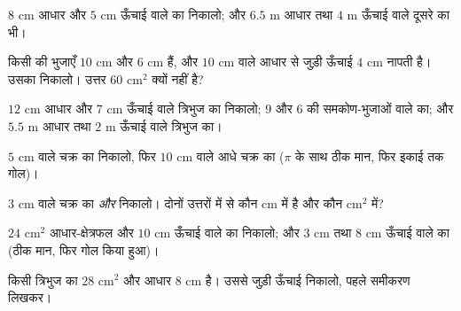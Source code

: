 \begin{exercise}[$\star$]\label{exo:g7:areas:1}
$8$ cm आधार और $5$ cm ऊँचाई वाले  का 
निकालो; और $6.5$ m आधार तथा $4$ m ऊँचाई वाले दूसरे का भी।
\end{exercise}

\begin{exercise}[$\star$]\label{exo:g7:areas:2}
किसी  की भुजाएँ $10$ cm और $6$ cm हैं, और $10$ cm
वाले आधार से जुड़ी ऊँचाई $4$ cm नापती है। उसका  निकालो।
उत्तर $60$ cm$^2$ क्यों नहीं है?
\end{exercise}

\begin{exercise}[$\star$]\label{exo:g7:areas:3}
$12$ cm आधार और $7$ cm ऊँचाई वाले त्रिभुज का  निकालो; $9$
और $6$ की समकोण-भुजाओं वाले  का; और $5.5$ m आधार तथा
$2$ m ऊँचाई वाले त्रिभुज का।
\end{exercise}

\begin{exercise}[$\star$]\label{exo:g7:areas:4}
$5$ cm  वाले चक्र का  निकालो, फिर $10$ cm 
वाले आधे चक्र का ($\pi$ के साथ ठीक मान, फिर इकाई तक गोल)।
\end{exercise}

\begin{exercise}[$\star$]\label{exo:g7:areas:5}
$3$ cm  वाले चक्र का  \emph{और}  निकालो।
दोनों उत्तरों में से कौन cm में है और कौन cm$^2$ में?
\end{exercise}

\begin{exercise}[$\star$]\label{exo:g7:areas:6}
$24$ cm$^2$ आधार-क्षेत्रफल और $10$ cm ऊँचाई वाले  का 
निकालो; और $3$ cm  तथा $8$ cm ऊँचाई वाले  का (ठीक मान,
फिर गोल किया हुआ)।
\end{exercise}

\begin{exercise}[$\star$]\label{exo:g7:areas:7}
किसी त्रिभुज का  $28$ cm$^2$ और आधार $8$ cm है। उससे जुड़ी
ऊँचाई निकालो, पहले समीकरण लिखकर।
\end{exercise}

